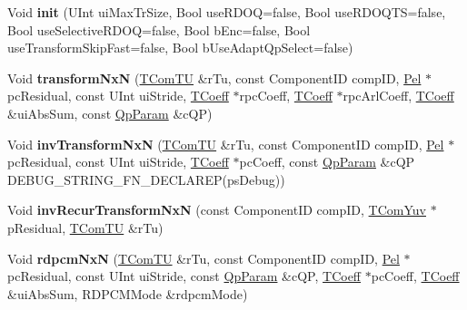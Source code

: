 \begin{DoxyCompactItemize}
\item 
\mbox{\label{class_t_com_tr_quant_a3afe891b9568e81184ddaa7e0342e65c}} 
Void {\bfseries init} (U\+Int ui\+Max\+Tr\+Size, Bool use\+R\+D\+OQ=false, Bool use\+R\+D\+O\+Q\+TS=false, Bool use\+Selective\+R\+D\+OQ=false, Bool b\+Enc=false, Bool use\+Transform\+Skip\+Fast=false, Bool b\+Use\+Adapt\+Qp\+Select=false)
\item 
\mbox{\label{class_t_com_tr_quant_ae58f38b985a4c2ace5a6b59e7e74d9be}} 
Void {\bfseries transform\+NxN} (\hyperlink{class_t_com_t_u}{T\+Com\+TU} \&r\+Tu, const Component\+ID comp\+ID, \hyperlink{_type_def_8h_af92141699657699b4b547be0c8517541}{Pel} $\ast$pc\+Residual, const U\+Int ui\+Stride, \hyperlink{_type_def_8h_a5bdd3b17d14ed1978c366d2d958c0300}{T\+Coeff} $\ast$rpc\+Coeff, \hyperlink{_type_def_8h_a5bdd3b17d14ed1978c366d2d958c0300}{T\+Coeff} $\ast$rpc\+Arl\+Coeff, \hyperlink{_type_def_8h_a5bdd3b17d14ed1978c366d2d958c0300}{T\+Coeff} \&ui\+Abs\+Sum, const \hyperlink{struct_qp_param}{Qp\+Param} \&c\+QP)
\item 
\mbox{\label{class_t_com_tr_quant_aae5d06dc2cec45706656f2e9feb3bddc}} 
Void {\bfseries inv\+Transform\+NxN} (\hyperlink{class_t_com_t_u}{T\+Com\+TU} \&r\+Tu, const Component\+ID comp\+ID, \hyperlink{_type_def_8h_af92141699657699b4b547be0c8517541}{Pel} $\ast$pc\+Residual, const U\+Int ui\+Stride, \hyperlink{_type_def_8h_a5bdd3b17d14ed1978c366d2d958c0300}{T\+Coeff} $\ast$pc\+Coeff, const \hyperlink{struct_qp_param}{Qp\+Param} \&c\+QP D\+E\+B\+U\+G\+\_\+\+S\+T\+R\+I\+N\+G\+\_\+\+F\+N\+\_\+\+D\+E\+C\+L\+A\+R\+EP(ps\+Debug))
\item 
\mbox{\label{class_t_com_tr_quant_a164e2eb922913d878b444413d78e7144}} 
Void {\bfseries inv\+Recur\+Transform\+NxN} (const Component\+ID comp\+ID, \hyperlink{class_t_com_yuv}{T\+Com\+Yuv} $\ast$p\+Residual, \hyperlink{class_t_com_t_u}{T\+Com\+TU} \&r\+Tu)
\item 
\mbox{\label{class_t_com_tr_quant_a540adb37fb004b58e6008bbb485543bd}} 
Void {\bfseries rdpcm\+NxN} (\hyperlink{class_t_com_t_u}{T\+Com\+TU} \&r\+Tu, const Component\+ID comp\+ID, \hyperlink{_type_def_8h_af92141699657699b4b547be0c8517541}{Pel} $\ast$pc\+Residual, const U\+Int ui\+Stride, const \hyperlink{struct_qp_param}{Qp\+Param} \&c\+QP, \hyperlink{_type_def_8h_a5bdd3b17d14ed1978c366d2d958c0300}{T\+Coeff} $\ast$pc\+Coeff, \hyperlink{_type_def_8h_a5bdd3b17d14ed1978c366d2d958c0300}{T\+Coeff} \&ui\+Abs\+Sum, R\+D\+P\+C\+M\+Mode \&rdpcm\+Mode)

\end{DoxyCompactItemize}
